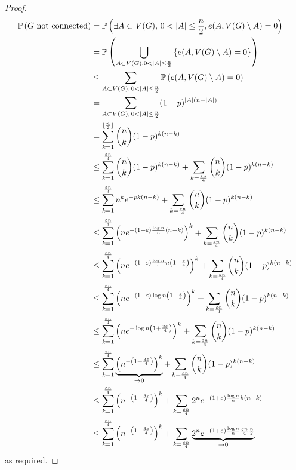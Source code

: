 \begin{proof}
	\begin{align*}
		\mathbb{P}\left({G \text{ not connected}}\right) &= \mathbb{P}\left({\exists A \subset V(G),\, 0 < \abs{A} \leq \frac{n}{2}, e(A, V(G) \setminus A) = 0}\right) \\
		&= \mathbb{P}\left({\bigcup_{A \subset V(G), 0 < \abs{A} \leq \frac{n}{2}} \qty{e(A, V(G) \setminus A) = 0}}\right) \\
		&\leq \sum_{A \subset V(G),\, 0 < \abs{A} \leq \frac{n}{2}} \mathbb{P}\left({e(A, V(G) \setminus A) = 0}\right) \\
		&= \sum_{A \subset V(G),\, 0 < \abs{A} \leq \frac{n}{2}} (1-p)^{\abs{A}(n-\abs{A})} \\
		&= \sum_{k=1}^{\lfloor\frac{n}{2}\rfloor} \binom{n}{k} (1-p)^{k (n-k)} \\
		&\leq \sum_{k=1}^{\frac{\varepsilon n}{4}} \binom n k (1-p)^{k (n-k)} + \sum_{k=\frac{\varepsilon n}{4}} \binom n k (1-p)^{k (n - k)} \\
		&\leq \sum_{k=1}^{\frac{\varepsilon n}{4}} n^k e^{-pk(n-k)} + \sum_{k=\frac{\varepsilon n}{4}} \binom n k (1-p)^{k (n - k)} \\
		&\leq \sum_{k=1}^{\frac{\varepsilon n}{4}} \qty(ne^{-(1+\varepsilon) \frac{\log n}{n} (n-k)})^k + \sum_{k=\frac{\varepsilon n}{4}} \binom n k (1-p)^{k (n - k)} \\
		&\leq \sum_{k=1}^{\frac{\varepsilon n}{4}} \qty(ne^{-(1+\varepsilon) \frac{\log n}{n} n\qty(1 - \frac{\varepsilon}{4})})^k + \sum_{k=\frac{\varepsilon n}{4}} \binom n k (1-p)^{k (n - k)} \\
		&\leq \sum_{k=1}^{\frac{\varepsilon n}{4}} \qty(ne^{-(1+\varepsilon) \log n \qty(1 - \frac{\varepsilon}{4})})^k + \sum_{k=\frac{\varepsilon n}{4}} \binom n k (1-p)^{k (n - k)} \\
		&\leq \sum_{k=1}^{\frac{\varepsilon n}{4}} \qty(ne^{-\log n\qty(1+\frac{3\varepsilon}{4})})^k + \sum_{k=\frac{\varepsilon n}{4}} \binom n k (1-p)^{k (n - k)} \\
		&\leq \sum_{k=1}^{\frac{\varepsilon n}{4}} \underbrace{\qty(n^{-\qty(1+\frac{3\varepsilon}{4})})^k}_{\to 0} + \sum_{k=\frac{\varepsilon n}{4}} \binom n k (1-p)^{k (n - k)} \\
		&\leq \sum_{k=1}^{\frac{\varepsilon n}{4}} \qty(n^{-\qty(1+\frac{3\varepsilon}{4})})^k + \sum_{k=\frac{\varepsilon n}{4}} 2^n e^{-(1 + \varepsilon) \frac{\log n}{n} k(n-k)} \\
		&\leq \sum_{k=1}^{\frac{\varepsilon n}{4}} \qty(n^{-\qty(1+\frac{3\varepsilon}{4})})^k + \sum_{k=\frac{\varepsilon n}{4}} \underbrace{2^n e^{-(1 + \varepsilon) \frac{\log n}{n} \frac{\varepsilon n}{4} \frac{n}{2}}}_{\to 0}
	\end{align*}
	as required.
\end{proof}
